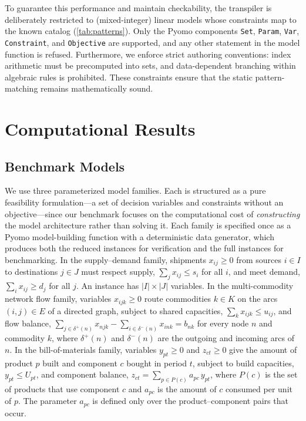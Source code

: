 \documentclass[runningheads]{llncs}
\begin{document}
To guarantee this performance and maintain checkability, the transpiler is deliberately restricted to (mixed-integer) linear models whose constraints map to the known catalog (\autoref{tab:patterns}). Only the Pyomo components \texttt{Set}, \texttt{Param}, \texttt{Var}, \texttt{Constraint}, and \texttt{Objective} are supported, and any other statement in the model function is refused. Furthermore, we enforce strict authoring conventions: index arithmetic must be precomputed into sets, and data-dependent branching within algebraic rules is prohibited. These constraints ensure that the static pattern-matching remains mathematically sound.





\section{Computational Results}
\label{sec:results}



\subsection{Benchmark Models}
\label{sec:results-benchmarks}

We use three parameterized model families. Each is structured as a pure feasibility formulation---a set of decision variables and constraints without an objective---since our benchmark focuses on the computational cost of \emph{constructing} the model architecture rather than solving it. Each family is specified once as a Pyomo model-building function with a deterministic data generator, which produces both the reduced instances for verification and the full instances for benchmarking. In the supply--demand family, shipments $x_{ij} \ge 0$ from sources $i \in I$ to destinations $j \in J$ must respect supply, $\sum_{j} x_{ij} \le s_i$ for all $i$, and meet demand, $\sum_{i} x_{ij} \ge d_j$ for all $j$. An instance has $|I| \times |J|$ variables. In the multi-commodity network flow family, variables $x_{ijk} \ge 0$ route commodities $k \in K$ on the arcs $(i,j) \in E$ of a directed graph, subject to shared capacities, $\sum_{k} x_{ijk} \le u_{ij}$, and flow balance, $\sum_{j \in \delta^{+}(n)} x_{njk} - \sum_{i \in \delta^{-}(n)} x_{ink} = b_{nk}$ for every node $n$ and commodity $k$, where $\delta^{+}(n)$ and $\delta^{-}(n)$ are the outgoing and incoming arcs of $n$. In the bill-of-materials family, variables $y_{pt} \ge 0$ and $z_{ct} \ge 0$ give the amount of product $p$ built and component $c$ bought in period $t$, subject to build capacities, $y_{pt} \le U_{pt}$, and component balance, $z_{ct} = \sum_{p \in P(c)} a_{pc}\, y_{pt}$, where $P(c)$ is the set of products that use component $c$ and $a_{pc}$ is the amount of $c$ consumed per unit of $p$. The parameter $a_{pc}$ is defined only over the product--component pairs that occur.
\end{document}
